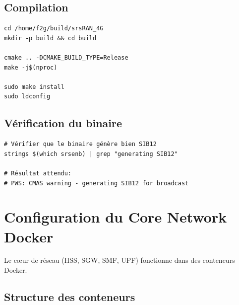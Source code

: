 \documentclass[11pt,a4paper]{article}
\begin{document}
\subsection{Compilation}

\begin{cmdbox}
\begin{lstlisting}[style=bashstyle]
cd /home/f2g/build/srsRAN_4G
mkdir -p build && cd build

cmake .. -DCMAKE_BUILD_TYPE=Release
make -j$(nproc)

sudo make install
sudo ldconfig
\end{lstlisting}
\end{cmdbox}

\subsection{Vérification du binaire}

\begin{successbox}
\begin{lstlisting}[style=bashstyle]
# Vérifier que le binaire génère bien SIB12
strings $(which srsenb) | grep "generating SIB12"

# Résultat attendu:
# PWS: CMAS warning - generating SIB12 for broadcast
\end{lstlisting}
\end{successbox}

\newpage

\section{Configuration du Core Network Docker}

Le cœur de réseau (HSS, SGW, SMF, UPF) fonctionne dans des conteneurs Docker.

\subsection{Structure des conteneurs}
\end{document}
